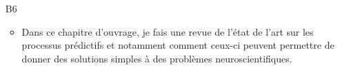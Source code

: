 \begin{enumerate}
%
%
%
%
%
%
%
%
%
%
%
%
%
%
%
%
%

%
%
%
\item[B6] %
\begin{itemize}
  \item Dans ce chapitre d'ouvrage, je fais une revue de l'état de l'art sur les processus prédictifs et notamment comment ceux-ci peuvent permettre de donner des solutions simples à des problèmes neuroscientifiques.
\end{itemize}

%
%
%
%


\end{enumerate}
